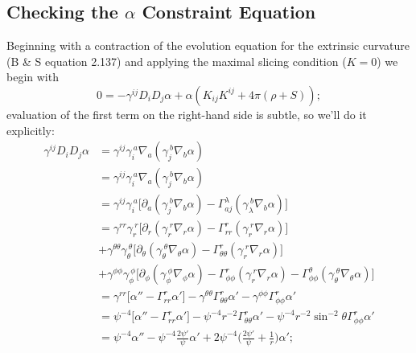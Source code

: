 \documentclass[12pt]{article}
\numberwithin{equation}{section}
\begin{document}
\subsection{Checking the $\alpha$ Constraint Equation}
Beginning with a contraction of the evolution equation for the extrinsic curvature (B \& S equation 2.137) and applying the maximal slicing condition ($K = 0$) we begin with
\begin{equation}
0 = - \gamma^{ij} D_i D_j \alpha + \alpha (K_{ij} K^{ij} + 4 \pi (\rho + S));
\end{equation}
evaluation of the first term on the right-hand side is subtle, so we'll do it explicitly:
\begin{equation}
\begin{aligned}
\gamma^{ij} D_i D_j \alpha &= \gamma^{ij} \gamma_{i}^{~a} \nabla_a (\gamma_{j}^{~b} \nabla_b \alpha) \\
&= \gamma^{ij} \gamma_{i}^{~a} \nabla_a (\gamma_{j}^{~b} \nabla_b \alpha) \\
&= \gamma^{ij} \gamma_{i}^{~a} \Big[ \partial_a (\gamma_{j}^{~b} \nabla_b \alpha) - \Gamma^{\lambda}_{a j} (\gamma_{\lambda}^{~b} \nabla_b \alpha) \Big] \\
&= \gamma^{rr} \gamma_{r}^{~r} \Big[ \partial_r (\gamma_{r}^{~r} \nabla_r \alpha) - \Gamma^{r}_{r r} (\gamma_{r}^{~r} \nabla_r \alpha) \Big] \\
&+ \gamma^{\theta \theta} \gamma_{\theta}^{~\theta} \Big[ \partial_\theta (\gamma_{\theta}^{~\theta} \nabla_\theta \alpha) - \Gamma^{r}_{\theta \theta} (\gamma_{r}^{~r} \nabla_r \alpha) \Big] \\
&+ \gamma^{\phi \phi} \gamma_{\phi}^{~\phi} \Big[ \partial_\phi (\gamma_{\phi}^{~\phi} \nabla_\phi \alpha) - \Gamma^{r}_{\phi \phi} (\gamma_{r}^{~r} \nabla_r \alpha) - \Gamma^{\theta}_{\phi \phi} (\gamma_{\theta}^{~\theta} \nabla_\theta \alpha) \Big] \\
&= \gamma^{rr} \Big[ \alpha'' - \Gamma^{r}_{r r} \alpha' \Big] - \gamma^{\theta \theta} \Gamma^{r}_{\theta \theta} \alpha' - \gamma^{\phi \phi} \Gamma^{r}_{\phi \phi} \alpha' \\
&= \psi^{-4} \Big[ \alpha'' - \Gamma^{r}_{r r} \alpha' \Big] - \psi^{-4} r^{-2} \Gamma^{r}_{\theta \theta} \alpha' - \psi^{-4} r^{-2} \sin^{-2} \theta \Gamma^{r}_{\phi \phi} \alpha' \\
&= \psi^{-4} \alpha'' - \psi^{-4} \frac{2 \psi'}{\psi} \alpha' + 2 \psi^{-4} \Big( \frac{2 \psi'}{\psi} + \frac{1}{r} \Big) \alpha'; \\
\end{aligned}
\end{equation}
\end{document}
